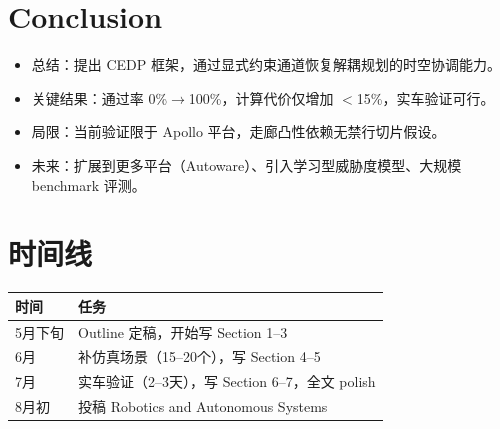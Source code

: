\documentclass[a4paper,12pt]{article}
\begin{document}
\section{Conclusion}

\begin{itemize}
  \item 总结：提出 CEDP 框架，通过显式约束通道恢复解耦规划的时空协调能力。
  \item 关键结果：通过率 0\%$\to$100\%，计算代价仅增加 $<$15\%，实车验证可行。
  \item 局限：当前验证限于 Apollo 平台，走廊凸性依赖无禁行切片假设。
  \item 未来：扩展到更多平台（Autoware）、引入学习型威胁度模型、大规模 benchmark 评测。
\end{itemize}

\section*{时间线}

\begin{tabular}{ll}
\toprule
时间 & 任务 \\
\midrule
5月下旬 & Outline 定稿，开始写 Section 1--3 \\
6月 & 补仿真场景（15--20个），写 Section 4--5 \\
7月 & 实车验证（2--3天），写 Section 6--7，全文 polish \\
8月初 & 投稿 Robotics and Autonomous Systems \\
\bottomrule
\end{tabular}
\end{document}
